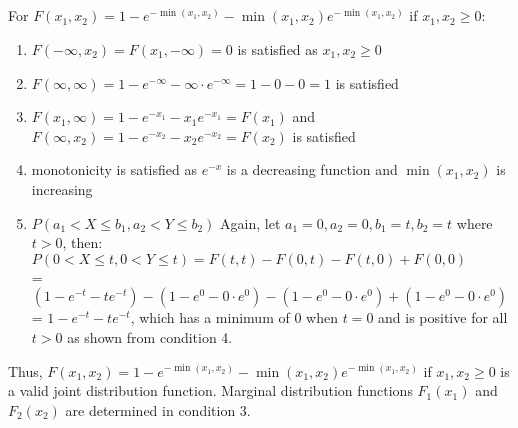 \documentclass[11pt,a4paper,margin=1in]{article}
\begin{document}
    \subsection{}
        For $F(x_1, x_2) = 1 - e^{-\min(x_1, x_2)} - \min(x_1, x_2) e^{-\min(x_1, x_2)}$ if $x_1, x_2 \geq 0$:
        \begin{enumerate}[1.]
            \item $F(-\infty, x_2) = F(x_1, -\infty) = 0$ is satisfied as $x_1, x_2 \geq 0$
            \item $F(\infty, \infty) = 1 - e^{-\infty} - \infty \cdot e^{-\infty} = 1 - 0 - 0 = 1$ is satisfied
            \item $F(x_1, \infty) = 1 - e^{-x_1} - x_1 e^{-x_1} = F(x_1)$ and $F(\infty, x_2) = 1 - e^{-x_2} - x_2 e^{-x_2} = F(x_2)$ is satisfied
            \item monotonicity is satisfied as $e^{-x}$ is a decreasing function and $\min(x_1, x_2)$ is increasing
            \item $P(a_1 < X \leq b_1, a_2 < Y \leq b_2)$ Again, let $a_1 = 0, a_2 = 0, b_1 = t, b_2 = t$ where $t > 0$, then:\\
            $P(0 < X \leq t, 0 < Y \leq t) = F(t, t) - F(0, t) - F(t, 0) + F(0, 0)$\\
            = $(1 - e^{-t} - t e^{-t}) - (1 - e^{0} - 0 \cdot e^{0}) - (1 - e^{0} - 0 \cdot e^{0}) + (1 - e^{0} - 0 \cdot e^{0})$\\
            = $1 - e^{-t} - t e^{-t}$, which has a minimum of 0 when $t = 0$ and is positive for all $t > 0$ as shown from condition 4.
        \end{enumerate}
        \noindent Thus, $F(x_1, x_2) = 1 - e^{-\min(x_1, x_2)} - \min(x_1, x_2) e^{-\min(x_1, x_2)}$ if $x_1, x_2 \geq 0$ is a valid joint distribution function. 
        Marginal distribution functions $F_1(x_1)$ and $F_2(x_2)$ are determined in condition 3.
\end{document}
